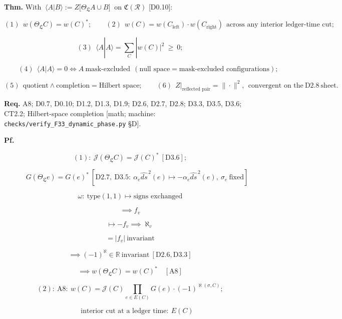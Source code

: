 \begin{theorem}\label{tag:CT2-8}
\textbf{Thm.} With $\ \langle A|B\rangle:=Z\bigl[\Theta_{\mathfrak L}A\cup B\bigr]\ $ on $\mathfrak C(\mathcal R)$ [D0.10]:

\[
(1)\ \ w(\Theta_{\mathfrak L}C)=w(C)^\ast;\qquad
(2)\ \ w(C)=w(C_{\mathrm{left}})\cdot w(C_{\mathrm{right}})\ \ \text{across any interior ledger-time cut};
\]

\[
(3)\ \ \langle A|A\rangle=\sum_C|w(C)|^2\ \ge\ 0;
\]

\[
\qquad (4)\ \ \langle A|A\rangle=0\iff A\ \text{mask-excluded}\ \ (\text{null space}=\text{mask-excluded configurations});
\]

\[
(5)\ \ \text{quotient}\wedge\text{completion}=\text{Hilbert space};\qquad
(6)\ \ Z\big|_{\text{reflected pair}}=\|\cdot\|^2,\ \ \text{convergent on the}\ \mathrm{D2.8}\ \text{sheet}.
\]

\textbf{Req.} A8; D0.7, D0.10; D1.2, D1.3, D1.9; D2.6, D2.7, D2.8; D3.3, D3.5, D3.6; CT2.2; Hilbert-space completion [math; machine: \texttt{checks/\allowbreak{}verify\_\allowbreak{}F33\_\allowbreak{}dynamic\_\allowbreak{}phase.py} §D].

\textbf{Pf.}

\[
(1):\ \mathcal J(\Theta_{\mathfrak L}C)=\mathcal J(C)^\ast\ [\mathrm{D3.6}];
\]

\[
\qquad G(\Theta_{\mathfrak L}e)=G(e)^\ast\ [\mathrm{D2.7},\ \mathrm{D3.5}:\ \alpha_e\widehat{ds}^{\,2}(e)\mapsto-\alpha_e\widehat{ds}^{\,2}(e),\ \sigma_e\ \text{fixed}]
\]

\[
\omega:\ \text{type}(1,1)\mapsto\text{signs exchanged}
\]

\[
\implies f_v
\]

\[
\mapsto -f_v\implies\aleph_v
\]

\[
= |f_v|\ \text{invariant}
\]

\[
\implies (-1)^\aleph\in\mathbb R\ \text{invariant}\ [\mathrm{D2.6},\mathrm{D3.3}]
\]

\[
\implies w(\Theta_{\mathfrak L}C)=w(C)^\ast\quad[\mathrm{A8}]
\]

\[
(2):\ \mathrm{A8}:\ w(C)=\mathcal J(C)\prod_{e\in E(C)}G(e)\cdot(-1)^{\aleph(\sigma,C)};
\]

\[
\qquad \text{interior cut at a ledger time}:\ E(C)
\]


\end{theorem}
